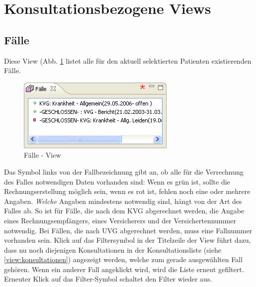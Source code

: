 

\section{Konsultationsbezogene Views}

\subsection{Fälle}
Diese View (Abb. \ref{fig:faelle2} listet alle für den aktuell selektierten
Patienten existierenden Fälle. 
\begin{figure}
  \includegraphics{images/faelleview}
  \caption{Fälle - View}
  \label{fig:faelle2}
\end{figure}

Das Symbol links von der Fallbezeichnung gibt an, ob alle für die Verrechnung
des Falles notwendigen Daten vorhanden sind: Wenn es grün ist, sollte die
Rechnungserstellung möglich sein, wenn es rot ist, fehlen noch eine oder mehrere
Angaben. \textit{Welche} Angaben mindestens notwendig sind, hängt von der Art
des Falles ab. So ist für Fälle, die nach dem KVG abgerechnet werden, die Angabe
eines Rechnungsempfängers, eines Versicherers und der Versichertennummer
notwendig. Bei Fällen, die nach UVG abgerechnet werden, muss eine Fallnummer
vorhanden sein.
Klick auf das Filtersymbol in der Titelzeile der View führt dazu, dass nu noch diejenigen Konsultationen in der Konsultationsliste (siehe \ref{view:konsultationen}) angezeigt werden, welche zum gerade ausgewählten Fall gehören. Wenn ein anderer Fall angeklickt wird, wird die Liste erneut gefiltert. Erneuter Klick auf das Filter-Symbol schaltet den Filter wieder aus.

